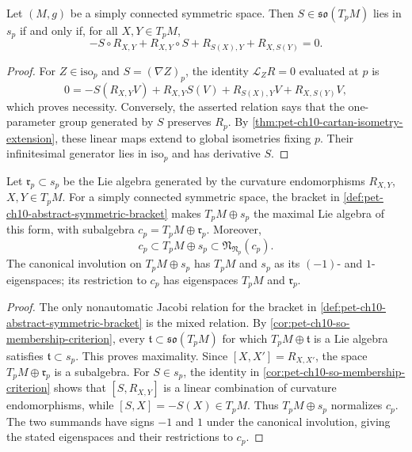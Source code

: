 \begin{corollary}
  \label{cor:pet-ch10-so-membership-criterion}
  Let $(M,g)$ be a simply connected symmetric space. Then $S\in\mathfrak{so}(T_pM)$
  lies in $s_p$ if and only if, for all $X,Y\in T_pM$,
  \[
    -S\circ R_{X,Y}+R_{X,Y}\circ S+R_{S(X),Y}+R_{X,S(Y)}=0.
  \]
\end{corollary}
\begin{proof}
  \sketch
  For $Z\in\mathrm{iso}_p$ and $S=(\nabla Z)_p$, the identity
  $\mathcal L_ZR=0$ evaluated at $p$ is
  \[
    0=-S(R_{X,Y}V)+R_{X,Y}S(V)+R_{S(X),Y}V+R_{X,S(Y)}V,
  \]
  which proves necessity. Conversely, the asserted relation says that the
  one-parameter group generated by $S$ preserves $R_p$. By
  \cref{thm:pet-ch10-cartan-isometry-extension}, these linear maps extend to
  global isometries fixing $p$. Their infinitesimal generator lies in
  $\mathrm{iso}_p$ and has derivative $S$.
\end{proof}

\begin{corollary}
  \label{cor:pet-ch10-maximal-subalgebra}
  Let $\mathfrak r_p\subset s_p$ be the Lie algebra generated by the curvature
  endomorphisms $R_{X,Y}$, $X,Y\in T_pM$. For a simply connected symmetric
  space, the bracket in
  \cref{def:pet-ch10-abstract-symmetric-bracket} makes $T_pM\oplus s_p$ the
  maximal Lie algebra of this form, with subalgebra
  $c_p=T_pM\oplus\mathfrak r_p$. Moreover,
  \[
    c_p\subset T_pM\oplus s_p
      \subset\mathfrak N_{\mathfrak N_p}(c_p).
  \]
  The canonical involution on $T_pM\oplus s_p$ has $T_pM$ and $s_p$ as its
  $(-1)$- and $1$-eigenspaces; its restriction to $c_p$ has eigenspaces
  $T_pM$ and $\mathfrak r_p$.
\end{corollary}
\begin{proof}
  \sketch
  The only nonautomatic Jacobi relation for the bracket in
  \cref{def:pet-ch10-abstract-symmetric-bracket} is the mixed relation. By
  \cref{cor:pet-ch10-so-membership-criterion}, every
  $\mathfrak t\subset\mathfrak{so}(T_pM)$ for which
  $T_pM\oplus\mathfrak t$ is a Lie algebra satisfies $\mathfrak t\subset s_p$.
  This proves maximality. Since $[X,X']=R_{X,X'}$, the space
  $T_pM\oplus\mathfrak r_p$ is a subalgebra. For $S\in s_p$, the identity in
  \cref{cor:pet-ch10-so-membership-criterion} shows that
  $[S,R_{X,Y}]$ is a linear combination of curvature endomorphisms, while
  $[S,X]=-S(X)\in T_pM$. Thus $T_pM\oplus s_p$ normalizes $c_p$. The two
  summands have signs $-1$ and $1$ under the canonical involution, giving the
  stated eigenspaces and their restrictions to $c_p$.
\end{proof}

